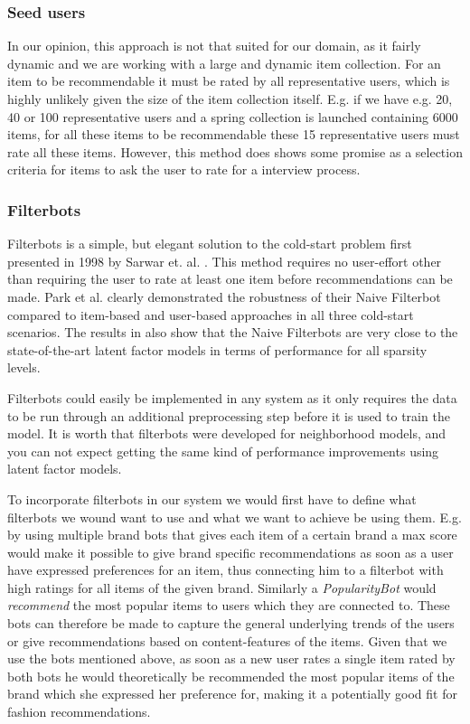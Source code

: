 \subsubsection{Seed users}

In our opinion, this approach is not that suited for our domain, as it fairly
dynamic and we are working with a large and dynamic item collection. For an item to be
recommendable it must be rated by all representative users, which is highly
unlikely given the size of the item collection itself. E.g. if we have e.g. 20, 40 or 100
representative users and a spring collection is launched containing 6000 items,
for all these items to be recommendable these 15 representative users must rate
all these items. However, this method does shows some promise as a selection criteria
for items to ask the user to rate for a interview process.

\subsubsection{Filterbots}

Filterbots is a simple, but elegant solution to the cold-start problem first
presented in 1998 by Sarwar et. al. \cite{Sarwar1998}. This method
requires no user-effort other than requiring the user to rate at least one
item before recommendations can be made. 
Park et al. \cite{Park2006} clearly demonstrated the robustness of their Naive
Filterbot compared to item-based and user-based approaches in all three
cold-start scenarios. The results in \cite{Agarwal2009, Agarwal2010} also show
that the Naive Filterbots are very close to the state-of-the-art
latent factor models in terms of performance for all sparsity levels.

Filterbots could easily be implemented in any system as it only requires
the data to be run through an additional preprocessing step before it
is used to train the model. It is worth that filterbots were developed
for neighborhood models, and you can not expect getting the same kind
of performance improvements using latent factor models.

To incorporate filterbots in our system we would first have to define what filterbots
we wound want to use and what we want to achieve be using them. E.g. by using multiple
brand bots that gives each item of a certain brand a max score would make it possible to give brand specific
recommendations as soon as a user have expressed preferences for an item, thus connecting
him to a filterbot with high ratings for all items of the given brand. Similarly
a \emph{PopularityBot} would \emph{recommend} the most popular items to users which
they are connected to. These bots can therefore be made to capture the general underlying
trends of the users or give recommendations based on content-features of the items.
Given that we use the bots mentioned above, as soon as a new user rates a single item
rated by both bots he would theoretically be recommended the most popular items of
the brand which she expressed her preference for, making it a potentially good fit for fashion
recommendations.

